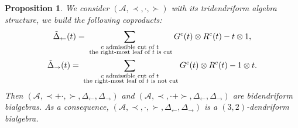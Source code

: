 \documentclass[pdftex]{sigma}
\numberwithin{equation}{section}
\theoremstyle{definition}
\theoremstyle{plain}
\newtheorem{Prop}[defi]{Proposition}
\begin{document}
\begin{Prop}\label{Prop:troideuxEg}
	We consider $(\mathcal{A},\prec,\cdot,\succ)$ with its tridendriform algebra structure, we build the following coproducts:
	\begin{gather*}
		\tilde{\Delta}_{\leftarrow}(t)=\sum_{\substack{c \text{ \normalfont admissible cut of }t \\ \text{ \normalfont the right-most leaf of $t$ is cut}}} G^c(t)\otimes R^c(t)-t\otimes 1, \\
		\tilde{\Delta}_{\rightarrow}(t)=\sum_{\substack{c \text{ \normalfont admissible cut of }t \\ \text{ \normalfont the right-most leaf of $t$ is not cut}}} G^c(t)\otimes R^c(t) -1\otimes t.
	\end{gather*}
	Then $(\mathcal{A},\prec+\cdot,\succ,\Delta_{\leftarrow},\Delta_{\rightarrow})$ and $(\mathcal{A},\prec,\cdot+\succ,\Delta_{\leftarrow},\Delta_{\rightarrow})$ are bidendriform bialgebras. As a consequence, $(\mathcal{A},\prec,\cdot,\succ,\Delta_{\leftarrow},\Delta_{\rightarrow})$ is a $(3,2)$-dendriform bialgebra.
\end{Prop}
\end{document}
